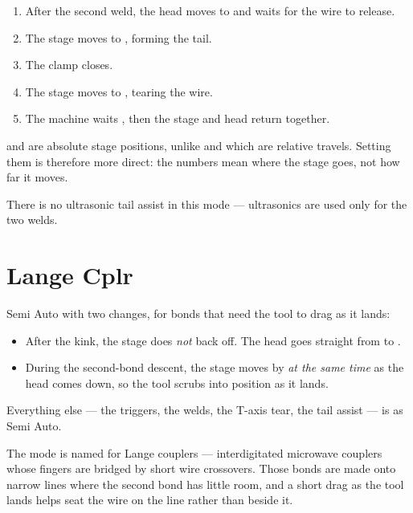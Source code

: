 \begin{enumerate}[leftmargin=*]
\item After the second weld, the head moves to  and
  waits for the wire to release.
\item The stage moves to , forming the tail.
\item The clamp closes.
\item The stage moves to , tearing the wire.
\item The machine waits , then the stage and head return
  together.
\end{enumerate}

\begin{wbnote}
 and  are absolute stage positions,
unlike  and  which are relative travels. Setting
them is therefore more direct: the numbers mean where the stage goes, not how
far it moves.
\end{wbnote}

There is no ultrasonic tail assist in this mode --- ultrasonics are used only
for the two welds.

\section{Lange Cplr}

Semi Auto with two changes, for bonds that need the tool to drag as it lands:

\begin{itemize}[leftmargin=*]
\item After the kink, the stage does \emph{not} back off. The head goes
  straight from  to .
\item During the second-bond descent, the stage moves by 
  \emph{at the same time} as the head comes down, so the tool scrubs into
  position as it lands.
\end{itemize}

Everything else --- the triggers, the welds, the T-axis tear, the tail assist
--- is as Semi Auto.

The mode is named for Lange couplers --- interdigitated microwave couplers
whose fingers are bridged by short wire crossovers. Those bonds are made onto
narrow lines where the second bond has little room, and a short drag as the
tool lands helps seat the wire on the line rather than beside it.

